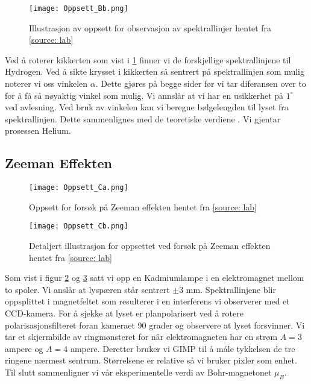 \documentclass[reprint,norsk,notitlepage,floatfix]{revtex4-2}
\begin{document}
    \begin{figure}[h!]
      \centering
      \texttt{[image: Oppsett\_Bb.png]}
      \caption{Illustrasjon av oppsett for observasjon av spektrallinjer hentet fra \ref{source: lab}}
      \label{fig: Oppsett_Bb}
    \end{figure}
    Ved å roterer kikkerten som vist i \cref{fig: Oppsett_Bb} finner vi de forskjellige spektrallinjene til Hydrogen. Ved å sikte krysset i kikkerten så sentrert på spektrallinjen som mulig noterer vi oss vinkelen $α$. Dette gjøres på begge sider før vi tar diferansen over to for å få så nøyaktig vinkel som mulig. Vi annslår at vi har en usikkerhet på $1^∘$ ved avlesning.
    Ved bruk av vinkelen kan vi beregne bølgelengden til lyset fra spektrallinjen. Dette sammenlignes med de teoretiske verdiene
    . Vi gjentar prosessen Helium. 
    
    
  \subsection{Zeeman Effekten}
    \begin{figure}[h!]
      \centering
      \texttt{[image: Oppsett\_Ca.png]}
      \caption{Oppsett for forsøk på Zeeman effekten hentet fra \ref{source: lab}}
      \label{fig: Oppsett_3a}
    \end{figure}
    
    \begin{figure}[h!]
      \centering
      \texttt{[image: Oppsett\_Cb.png]}
      \caption{Detaljert illustrasjon for oppsettet ved forsøk på Zeeman effekten hentet fra \ref{source: lab}}
      \label{fig: Oppsett_3b}
    \end{figure}
    
    Som vist i figur \cref{fig: Oppsett_3a} og \cref{fig: Oppsett_3b} satt vi opp en Kadmiumlampe i en elektromagnet mellom to spoler. Vi anslår at lyspæren står sentrert $\pm 3$ mm. Spektrallinjene blir oppsplittet i magnetfeltet som resulterer i en interferens vi observerer med et CCD-kamera. 
    For å sjekke at lyset er planpolarisert ved å rotere polarisasjonsfilteret foran kameraet 90 grader 
    og observere at lyset forsvinner. Vi tar et skjermbilde av ringmønsteret for når elektromagneten har en strøm $A = 3$ ampere og $A = 4$ ampere. Deretter bruker vi GIMP til å måle tykkelsen de tre ringene nærmest sentrum. Størrelsene er relative så vi bruker pixler som enhet. Til slutt sammenligner vi vår eksperimentelle verdi av Bohr-magnetonet $μ_B$. 
    
\end{document}
